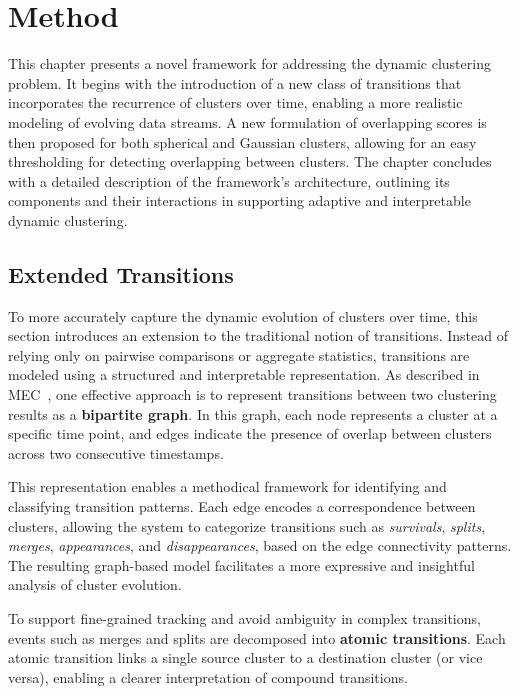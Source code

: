 \chapter{Method}\label{ch:method}

This chapter presents a novel framework for addressing the dynamic clustering
problem. It begins with the introduction of a new class of transitions that
incorporates the recurrence of clusters over time, enabling a more realistic
modeling of evolving data streams. A new formulation of overlapping scores is
then proposed for both spherical and Gaussian clusters, allowing for an easy
thresholding for detecting overlapping between clusters. The chapter concludes
with a detailed description of the framework's architecture, outlining its
components and their interactions in supporting adaptive and interpretable
dynamic clustering.

\section{Extended Transitions}\label{sec:extended_transitions}

To more accurately capture the dynamic evolution of clusters over time, this
section introduces an extension to the traditional notion of transitions.
Instead of relying only on pairwise comparisons or aggregate statistics,
transitions are modeled using a structured and interpretable representation. As
described in MEC~\cite{mec}, one effective approach is to represent transitions
between two clustering results as a \textbf{bipartite graph}. In this graph,
each node represents a cluster at a specific time point, and edges indicate the
presence of overlap between clusters across two consecutive timestamps.

This representation enables a methodical framework for identifying and
classifying transition patterns. Each edge encodes a correspondence between
clusters, allowing the system to categorize transitions such as
\emph{survivals}, \emph{splits}, \emph{merges}, \emph{appearances}, and
\emph{disappearances}, based on the edge connectivity patterns. The resulting
graph-based model facilitates a more expressive and insightful analysis of
cluster evolution.



To support fine-grained tracking and avoid ambiguity in complex transitions,
events such as merges and splits are decomposed into \textbf{atomic
      transitions}. Each atomic transition links a single source cluster to a
destination cluster (or vice versa), enabling a clearer interpretation of
compound transitions.

